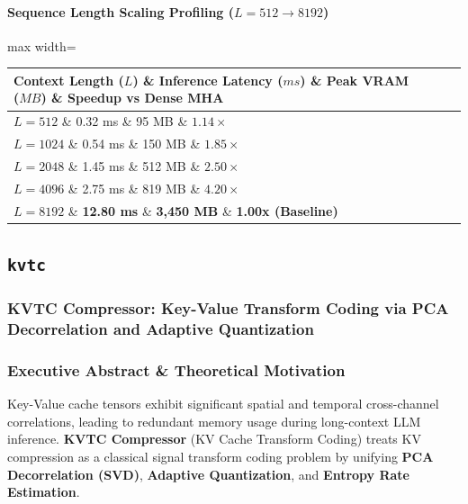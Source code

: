 \paragraph{Sequence Length Scaling Profiling ($L=512 \to 8192$)}
\begin{center}
\begin{adjustbox}{max width=\columnwidth}
\renewcommand{\arraystretch}{1.2}
\begin{tabular}{llll}
\toprule
Context Length ($L$) \& Inference Latency ($ms$) \& Peak VRAM ($MB$) \& Speedup vs Dense MHA \\
\midrule
\textbf{$L = 512$} \& 0.32 ms \& 95 MB \& $1.14\times$ \\
\textbf{$L = 1024$} \& 0.54 ms \& 150 MB \& $1.85\times$ \\
\textbf{$L = 2048$} \& 1.45 ms \& 512 MB \& $2.50\times$ \\
\textbf{$L = 4096$} \& 2.75 ms \& 819 MB \& $4.20\times$ \\
\textbf{$L = 8192$} \& \textbf{12.80 ms} \& \textbf{3,450 MB} \& \textbf{1.00x (Baseline)} \\


\bottomrule
\end{tabular}
\end{adjustbox}
\end{center}

\subsection{\texttt{kvtc}}
\subsubsection*{KVTC Compressor: Key-Value Transform Coding via PCA Decorrelation and Adaptive Quantization}

\subsubsection*{Executive Abstract \& Theoretical Motivation}

Key-Value cache tensors exhibit significant spatial and temporal cross-channel correlations, leading to redundant memory usage during long-context LLM inference. \textbf{KVTC Compressor} (KV Cache Transform Coding) treats KV compression as a classical signal transform coding problem by unifying \textbf{PCA Decorrelation (SVD)}, \textbf{Adaptive Quantization}, and \textbf{Entropy Rate Estimation}.

